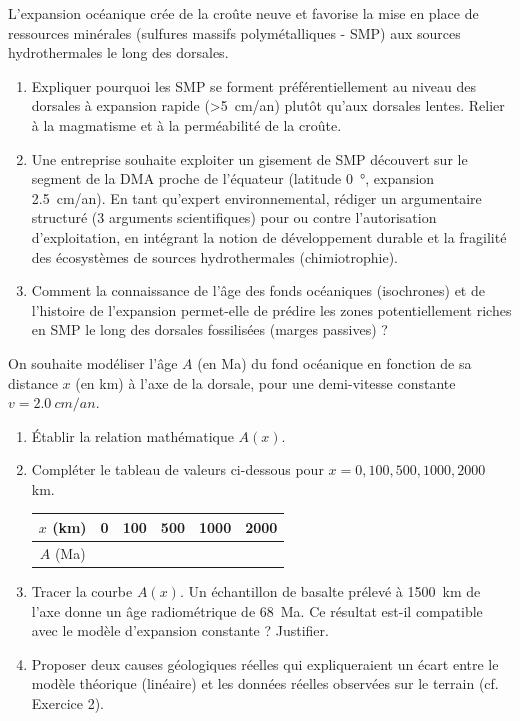 \documentclass[11pt]{article}
\begin{document}
\begin{exercice}
\label{exo:synthese}
L'expansion océanique crée de la croûte neuve et favorise la mise en place de ressources minérales (sulfures massifs polymétalliques - SMP) aux sources hydrothermales le long des dorsales.
\begin{enumerate}
    \item[2 pts] Expliquer pourquoi les SMP se forment préférentiellement au niveau des dorsales à expansion rapide (\textgreater \SI{5}{cm/an}) plutôt qu'aux dorsales lentes. Relier à la magmatisme et à la perméabilité de la croûte.
    \item[3 pts] Une entreprise souhaite exploiter un gisement de SMP découvert sur le segment de la DMA proche de l'équateur (latitude \SI{0}{°}, expansion \SI{2,5}{cm/an}). En tant qu'expert environnemental, rédiger un argumentaire structuré (3 arguments scientifiques) pour ou contre l'autorisation d'exploitation, en intégrant la notion de développement durable et la fragilité des écosystèmes de sources hydrothermales (chimiotrophie).
    \item[2 pts] Comment la connaissance de l'âge des fonds océaniques (isochrones) et de l'histoire de l'expansion permet-elle de prédire les zones potentiellement riches en SMP le long des dorsales fossilisées (marges passives) ?
\end{enumerate}
\end{exercice}

\begin{exercice}
\label{exo:model}
On souhaite modéliser l'âge $A$ (en Ma) du fond océanique en fonction de sa distance $x$ (en km) à l'axe de la dorsale, pour une demi-vitesse constante $v = \SI{2,0}{cm/an}$.
\begin{enumerate}
    \item[1 pt] Établir la relation mathématique $A(x)$.
    \item[2 pts] Compléter le tableau de valeurs ci-dessous pour $x = 0, 100, 500, 1000, 2000$ km.
    \begin{center}
    \begin{tabular}{|c|c|c|c|c|c|}
    \hline
    $x$ (km) & 0 & 100 & 500 & 1000 & 2000 \\
    \hline
    $A$ (Ma) & & & & & \\
    \hline
    \end{tabular}
    \end{center}
    \item[2 pts] Tracer la courbe $A(x)$. Un échantillon de basalte prélevé à \SI{1500}{km} de l'axe donne un âge radiométrique de \SI{68}{Ma}. Ce résultat est-il compatible avec le modèle d'expansion constante ? Justifier.
    \item[2 pts] Proposer deux causes géologiques réelles qui expliqueraient un écart entre le modèle théorique (linéaire) et les données réelles observées sur le terrain (cf. Exercice 2).
\end{enumerate}
\end{exercice}
\end{document}
